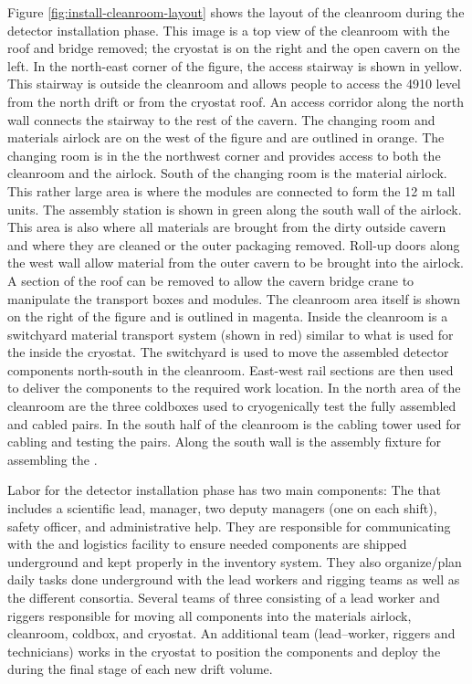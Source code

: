 Figure \ref{fig:install-cleanroom-layout} shows the layout of the cleanroom during the detector installation phase. This image is a top view of the cleanroom with the roof and bridge removed; the cryostat is on the right and the open cavern on the left. In the north-east corner of the figure, the access stairway is shown in yellow. This stairway is outside the cleanroom and allows people to access the 4910 level from the north drift or from the cryostat roof. An access corridor along the north wall connects the stairway to the rest of the cavern. The changing room and materials airlock are on the west of the figure and are outlined in orange. The changing room is in the the northwest corner and provides access to both the cleanroom and the airlock. South of the changing room is the material airlock. This rather large area is where the  modules are connected to form the 12 \si{m} tall units. The assembly station is shown in green along the south wall of the airlock. This area is also where all materials are brought from the dirty outside cavern and where they are cleaned or the outer packaging removed. Roll-up doors along the west wall allow material from the outer cavern to be brought into the airlock. A section of the roof can be removed to allow the cavern bridge crane to manipulate the  transport boxes and modules. The cleanroom area itself is shown on the right of the figure and is outlined in magenta. Inside the cleanroom is a switchyard material transport system (shown in red) similar to what is used for the  inside the cryostat. The switchyard is used to move the assembled detector components north-south in the cleanroom. East-west rail sections are then used to deliver the components to the required work location. In the north area of the cleanroom are the three coldboxes used to cryogenically test the fully assembled and cabled  pairs. In the south half of the cleanroom is the  cabling tower used for cabling and testing the  pairs. Along the south wall is the  assembly fixture for assembling the . 

Labor for the detector installation phase has two main components: 
The  that includes a scientific lead, manager, two deputy managers (one on each shift), safety officer, and administrative help. They are responsible for communicating with the  and logistics facility to ensure needed components are shipped underground and kept properly in the inventory system.  They also organize/plan daily tasks done underground with the lead workers and rigging teams as well as the different consortia.  Several teams of three  consisting of a lead worker and riggers responsible for moving all  components into the materials airlock,  cleanroom, coldbox, and cryostat. An additional team (lead--worker, riggers and technicians) works in the cryostat to position the  components and deploy the  during the final stage of each new drift volume. 

